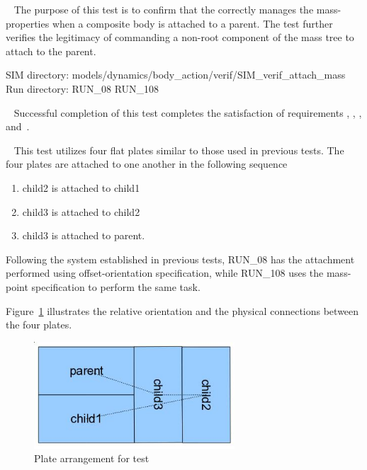 \label{test:mass_08}
\begin{description}
\item[Purpose:] \ \newline
The purpose of this test is to confirm that the \ModelDesc correctly manages 
the mass-properties when a composite body is attached to a parent.  The test further verifies the legitimacy of commanding a non-root component of the mass tree to attach to the parent.

\item SIM directory: 
models/dynamics/body\_action/verif/SIM\_verif\_attach\_mass\\
Run directory: RUN\_08 RUN\_108

\item[Requirements:] \ \newline
Successful completion of this test completes the satisfaction of 
requirements , , 
, and~.

\item[Procedure:]\ \newline
This test utilizes four flat plates similar to those used in previous 
tests.  The four plates are attached to one another in the following sequence
\begin{enumerate}
 \item child2 is attached to child1
 \item child3 is attached to child2
 \item child3 is attached to parent. 
\end{enumerate}

Following the system established in previous tests, RUN\_08 has the attachment 
performed using offset-orientation specification, while RUN\_108 uses the 
mass-point specification to perform the same task.

Figure~\ref{fig:four_plates} illustrates the relative orientation and the 
physical connections between the four plates.

\begin{figure}[h]
\begin{center}
\includegraphics[height=40mm]{pics/four_plates.jpg}
\caption{Plate arrangement for test}
\label{fig:four_plates}
\end{center}
\end{figure}


\end{description}
